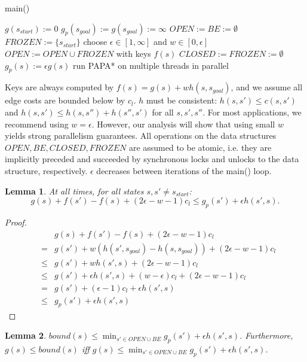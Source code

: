 \documentclass[letterpaper]{article}
\newtheorem{lemma}{Lemma}
\begin{document}
\begin{algorithm}
\caption{main()}
\label{alg:main}
\begin{algorithmic}
\STATE $g(s_{start}) := 0$
\STATE $g_p(s_{goal}) := g(s_{goal}) := \infty$
\STATE $OPEN := BE := \emptyset$
\STATE $FROZEN := \{s_{start}\}$
\REPEAT
\STATE choose $\epsilon \in [1,\infty]$ and $w \in [0,\epsilon]$
\STATE $OPEN := OPEN \cup FROZEN$ with keys $f(s)$
\STATE $CLOSED := FROZEN := \emptyset$
\STATE $g_p(s) := \epsilon g(s)$
\ENDFOR
\STATE run PAPA* on multiple threads in parallel
\end{algorithmic}
\end{algorithm}

Keys are always computed by $f(s) = g(s) + wh(s,s_{goal})$, and we assume all edge costs are bounded below by $c_l$. $h$ must be consistent: $h(s,s') \le c(s,s')$ and $h(s,s') \le h(s,s'')+h(s'',s')$ for all $s,s',s''$. For most applications, we recommend using $w = \epsilon$. However, our analysis will show that using small $w$ yields strong parallelism guarantees. All operations on the data structures $OPEN,BE,CLOSED,FROZEN$ are assumed to be atomic, i.e. they are implicitly preceded and succeeded by synchronous locks and unlocks to the data structure, respectively. $\epsilon$ decreases between iterations of the main() loop.

\begin{lemma}
\label{lem:indep}
At all times, for all states $s,s' \ne s_{start}$:
\[g(s) + f(s') - f(s) + (2\epsilon-w-1) c_l \le g_p(s') + \epsilon h(s',s).\]
\end{lemma}

\begin{proof}
\begin{eqnarray*}
&&g(s) + f(s') - f(s) + (2\epsilon-w-1) c_l
\\&=& g(s') + w(h(s',s_{goal}) - h(s,s_{goal})) + (2\epsilon-w-1) c_l
\\&\le& g(s') + wh(s',s) + (2\epsilon-w-1) c_l
\\&\le& g(s') + \epsilon h(s',s) + (w-\epsilon) c_l + (2\epsilon-w-1) c_l
\\&=& g(s') + (\epsilon-1) c_l + \epsilon h(s',s)
\\&\le& g_p(s') + \epsilon h(s',s)
\end{eqnarray*}
\end{proof}

\begin{lemma}
\label{lem:bound}
$bound(s) \le \min_{s'\in OPEN \cup BE} g_p(s') + \epsilon h(s',s)$. Furthermore, $g(s) \le bound(s)$ iff $g(s) \le \min_{s'\in OPEN \cup BE} g_p(s') + \epsilon h(s',s)$.
\end{lemma}
\end{document}
